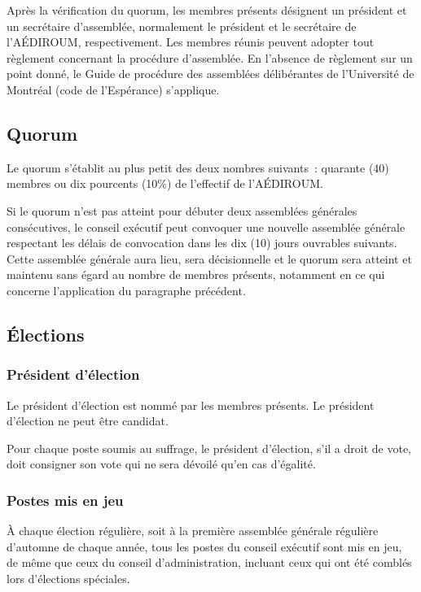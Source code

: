 \documentclass{aediroum}
\begin{document}
Après la vérification du quorum, les membres présents désignent un président et un secrétaire d'assemblée, normalement le président et le secrétaire de l'AÉDIROUM, respectivement.
Les membres réunis peuvent adopter tout règlement concernant la procédure d'assemblée. En l'absence de règlement sur un point donné, le Guide de procédure des assemblées délibérantes de l'Université de Montréal (code de l'Espérance) s'applique.

\subsection{Quorum}\label{sec:quorum}

Le quorum s'établit au plus petit des deux nombres suivants~: quarante (40) membres ou dix pourcents (10\%) de l'effectif de l'AÉDIROUM.

Si le quorum n'est pas atteint pour débuter deux assemblées générales consécutives, le conseil exécutif peut convoquer une nouvelle assemblée générale respectant les délais de convocation dans les dix (10) jours ouvrables suivants. Cette assemblée générale aura lieu, sera décisionnelle et le quorum sera atteint et maintenu sans égard au nombre de membres présents, notamment en ce qui concerne l'application du paragraphe précédent.

\subsection{Élections}\label{sec:elections}
\subsubsection{Président d'élection}\label{sec:president-delection}

Le président d'élection est nommé par les membres présents. Le président d'élection ne peut être candidat.

Pour chaque poste soumis au suffrage, le président d'élection, s'il a droit de vote, doit consigner son vote qui ne sera dévoilé qu'en cas d'égalité.

\subsubsection{Postes mis en jeu}\label{sec:postes-mis-en-jeu}
À chaque élection régulière, soit à la première assemblée générale régulière d'automne de chaque année, tous les postes du conseil exécutif sont mis en jeu, de même que ceux du conseil d'administration, incluant ceux qui ont été comblés lors d'élections spéciales.
\end{document}
